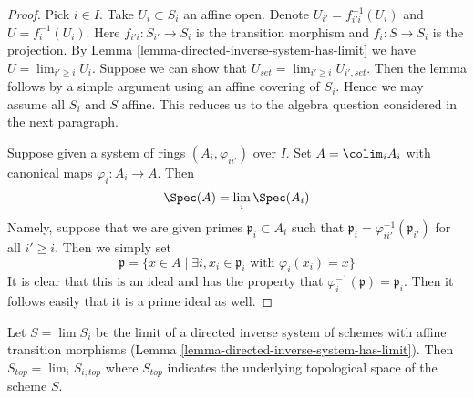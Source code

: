 \begin{proof}
Pick $i \in I$. Take $U_i \subset S_i$ an affine open.
Denote $U_{i'} = f_{i'i}^{-1}(U_i)$ and $U = f_i^{-1}(U_i)$.
Here $f_{i'i} : S_{i'} \to S_i$ is the transition morphism
and $f_i : S \to S_i$ is the projection.
By Lemma \ref{lemma-directed-inverse-system-has-limit}
we have $U = \lim_{i' \geq i} U_i$.
Suppose we can show that $U_{set} = \lim_{i' \geq i} U_{i', set}$. Then
the lemma follows by a simple argument using an affine covering of $S_i$.
Hence we may assume all $S_i$ and $S$ affine. This reduces us to the
algebra question considered in the next paragraph.

\medskip\noindent
Suppose given a system of rings $(A_i, \varphi_{ii'})$
over $I$. Set $A = \colim_i A_i$ with canonical maps $\varphi_i : A_i \to A$.
Then
$$
\Spec(A) = \lim_i \Spec(A_i)
$$
Namely, suppose that we are given primes $\mathfrak p_i \subset A_i$
such that $\mathfrak p_i = \varphi_{ii'}^{-1}(\mathfrak p_{i'})$
for all $i' \geq i$. Then we simply set
$$
\mathfrak p =
\{x \in A
\mid
\exists i, x_i \in \mathfrak p_i \text{ with }\varphi_i(x_i) = x\}
$$
It is clear that this is an ideal and has the property that
$\varphi_i^{-1}(\mathfrak p) = \mathfrak p_i$. Then it follows
easily that it is a prime ideal as well.
\end{proof}

\begin{lemma}
\label{lemma-inverse-limit-top}
\begin{reference}
\cite[IV, Proposition 8.2.9]{EGA}
\end{reference}
Let $S = \lim S_i$ be the limit of a directed inverse system
of schemes with affine transition morphisms
(Lemma \ref{lemma-directed-inverse-system-has-limit}). Then
$S_{top} = \lim_i S_{i, top}$ where $S_{top}$
indicates the underlying topological space of the scheme $S$.
\end{lemma}

